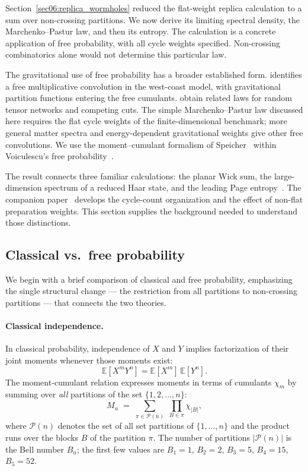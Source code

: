 \documentclass[11pt,letterpaper]{article}
\theoremstyle{plain}
\theoremstyle{definition}
\theoremstyle{remark}
\begin{document}
Section~\ref{sec06:replica_wormholes} reduced the flat-weight replica
calculation to a sum over non-crossing partitions.  We now derive its limiting
spectral density, the Marchenko--Pastur law, and then its entropy.  The
calculation is a concrete application of free probability, with all cycle
weights specified.  Non-crossing combinatorics alone would not determine this
particular law.

The gravitational use of free probability has a broader established form.
\citet{wang2023} identifies a free multiplicative convolution in the
west-coast model, with gravitational partition functions entering the free
cumulants.  \citet{chengetal2024} obtain related laws for random tensor
networks and competing cuts.  The simple Marchenko--Pastur law discussed here
requires the flat cycle weights of the finite-dimensional benchmark; more
general matter spectra and energy-dependent gravitational weights give other
free convolutions.  We use the moment--cumulant formalism of
Speicher~\cite{speicher1994} within Voiculescu's free
probability~\cite{voiculescu1991}.

The result connects three familiar calculations: the planar Wick sum, the
large-dimension spectrum of a reduced Haar state, and the leading Page
entropy~\cite{marchenkopastur1967,lubkin1978,lloydpagels1988,page1993}.
The companion paper~\cite{wuebben2026paper1} develops the cycle-count
organization and the effect of non-flat preparation weights.  This section
supplies the background needed to understand those distinctions.

\subsection{Classical vs.\ free probability}
\label{subsec07:classical_vs_free}

We begin with a brief comparison of classical and free probability,
emphasizing the single structural change --- the restriction from all
partitions to non-crossing partitions --- that connects the two theories.

\paragraph{Classical independence.}
In classical probability, independence of $X$ and $Y$ implies factorization
of their joint moments whenever those moments exist:
\begin{equation}
  \mathbb{E}[X^m Y^n] = \mathbb{E}[X^m]\,\mathbb{E}[Y^n].
  \label{eq07:classical_independence}
\end{equation}
The moment-cumulant relation expresses moments in terms of cumulants
$\chi_m$ by summing over \emph{all} partitions of the set $\{1,2,\ldots,n\}$:
\begin{equation}
  M_n \;=\; \sum_{\pi \in \mathcal{P}(n)} \;\prod_{B \in \pi} \chi_{|B|},
  \label{eq07:classical_moment_cumulant}
\end{equation}
where $\mathcal{P}(n)$ denotes the set of all set partitions of
$\{1,\ldots,n\}$ and the product runs over the blocks $B$ of the
partition $\pi$.  The number of partitions $|\mathcal{P}(n)|$ is the
Bell number $B_n$; the first few values are $B_1=1$, $B_2=2$, $B_3=5$,
$B_4=15$, $B_5=52$.
\end{document}

